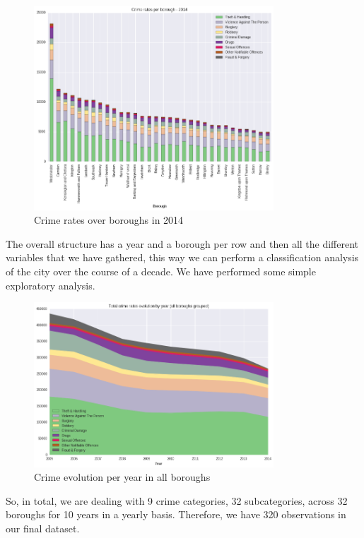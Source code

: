 \documentclass[12pt, openany]{report}
\begin{document}
\begin{figure}[h!]
\centering
        \includegraphics[width=0.8\textwidth]{images/crimes_borough_2014.png}
        \caption{Crime rates over boroughs in 2014}
\end{figure}

The overall structure has a year and a borough per row and then all the different variables that we have gathered, this way we can perform a classification analysis of the city over the course of a decade. We have performed some simple exploratory analysis.

\begin{figure}[h!]
\centering
        \includegraphics[width=0.8\textwidth]{images/crime_evolution_total.png}
        \caption{Crime evolution per year in all boroughs}
\end{figure}

So, in total, we are dealing with 9 crime categories, 32 subcategories, across 32 boroughs for 10 years in a yearly basis. Therefore, we have 320 observations in our final dataset.
\end{document}
